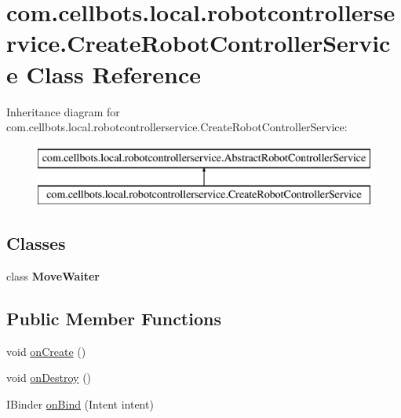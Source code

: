 \hypertarget{classcom_1_1cellbots_1_1local_1_1robotcontrollerservice_1_1_create_robot_controller_service}{\section{com.\-cellbots.\-local.\-robotcontrollerservice.\-Create\-Robot\-Controller\-Service Class Reference}
\label{classcom_1_1cellbots_1_1local_1_1robotcontrollerservice_1_1_create_robot_controller_service}
}
Inheritance diagram for com.\-cellbots.\-local.\-robotcontrollerservice.\-Create\-Robot\-Controller\-Service\-:\begin{figure}[H]
\begin{center}
\leavevmode
\includegraphics[height=2.000000cm]{classcom_1_1cellbots_1_1local_1_1robotcontrollerservice_1_1_create_robot_controller_service}
\end{center}
\end{figure}
\subsection*{Classes}
\begin{DoxyCompactItemize}
\item 
class {\bfseries Move\-Waiter}
\end{DoxyCompactItemize}
\subsection*{Public Member Functions}
\begin{DoxyCompactItemize}
\item 
void \hyperlink{classcom_1_1cellbots_1_1local_1_1robotcontrollerservice_1_1_create_robot_controller_service_af41ec99789d1a3abf3b5ae653edbb6df}{on\-Create} ()
\item 
void \hyperlink{classcom_1_1cellbots_1_1local_1_1robotcontrollerservice_1_1_create_robot_controller_service_aea682422418b67f8b88540b81bfe963b}{on\-Destroy} ()
\item 
I\-Binder \hyperlink{classcom_1_1cellbots_1_1local_1_1robotcontrollerservice_1_1_create_robot_controller_service_a61fbee65edd355f807c3a14a8303ab70}{on\-Bind} (Intent intent)
\end{DoxyCompactItemize}


